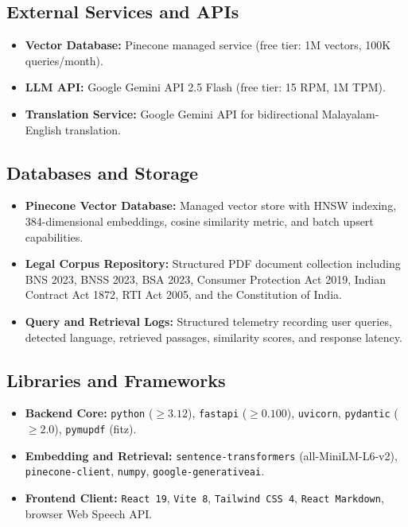 \documentclass[12pt,a4paper]{report}
\begin{document}
\subsection{External Services and APIs}
\begin{itemize}
    \item \textbf{Vector Database:} Pinecone managed service (free tier: 1M vectors, 100K queries/month).
    \item \textbf{LLM API:} Google Gemini API 2.5 Flash (free tier: 15 RPM, 1M TPM).
    \item \textbf{Translation Service:} Google Gemini API for bidirectional Malayalam-English translation.
\end{itemize}

\subsection{Databases and Storage}
\begin{itemize}
    \item \textbf{Pinecone Vector Database:} Managed vector store with HNSW indexing, 384-dimensional embeddings, cosine similarity metric, and batch upsert capabilities.
    \item \textbf{Legal Corpus Repository:} Structured PDF document collection including BNS 2023, BNSS 2023, BSA 2023, Consumer Protection Act 2019, Indian Contract Act 1872, RTI Act 2005, and the Constitution of India.
    \item \textbf{Query and Retrieval Logs:} Structured telemetry recording user queries, detected language, retrieved passages, similarity scores, and response latency.
\end{itemize}

\subsection{Libraries and Frameworks}
\begin{itemize}
    \item \textbf{Backend Core:} \texttt{python} ($\ge 3.12$), \texttt{fastapi} ($\ge 0.100$), \texttt{uvicorn}, \texttt{pydantic} ($\ge 2.0$), \texttt{pymupdf} (fitz).
    \item \textbf{Embedding and Retrieval:} \texttt{sentence-transformers} (all-MiniLM-L6-v2), \texttt{pinecone-client}, \texttt{numpy}, \texttt{google-generativeai}.
    \item \textbf{Frontend Client:} \texttt{React 19}, \texttt{Vite 8}, \texttt{Tailwind CSS 4}, \texttt{React Markdown}, browser Web Speech API.
\end{itemize}
\end{document}
